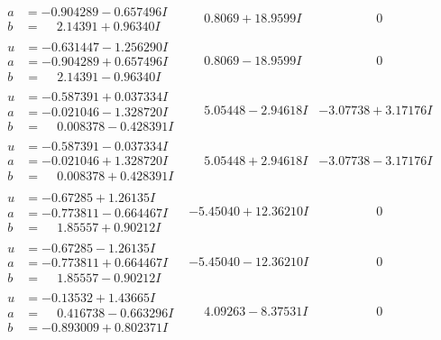 \documentclass[1p]{elsarticle_modified}
\theoremstyle{definition}
\begin{document}
$$\begin{array}{c|c|c}
\begin{aligned}
a &= -0.904289 - 0.657496 I \\
b &= \phantom{-}2.14391 + 0.96340 I\end{aligned}
 & \phantom{-}0.8069 + 18.9599 I & \phantom{-0.000000 } 0 \\ \hline\begin{aligned}
u &= -0.631447 - 1.256290 I \\
a &= -0.904289 + 0.657496 I \\
b &= \phantom{-}2.14391 - 0.96340 I\end{aligned}
 & \phantom{-}0.8069 - 18.9599 I & \phantom{-0.000000 } 0 \\ \hline\begin{aligned}
u &= -0.587391 + 0.037334 I \\
a &= -0.021046 - 1.328720 I \\
b &= \phantom{-}0.008378 - 0.428391 I\end{aligned}
 & \phantom{-}5.05448 - 2.94618 I & -3.07738 + 3.17176 I \\ \hline\begin{aligned}
u &= -0.587391 - 0.037334 I \\
a &= -0.021046 + 1.328720 I \\
b &= \phantom{-}0.008378 + 0.428391 I\end{aligned}
 & \phantom{-}5.05448 + 2.94618 I & -3.07738 - 3.17176 I \\ \hline\begin{aligned}
u &= -0.67285 + 1.26135 I \\
a &= -0.773811 - 0.664467 I \\
b &= \phantom{-}1.85557 + 0.90212 I\end{aligned}
 & -5.45040 + 12.36210 I & \phantom{-0.000000 } 0 \\ \hline\begin{aligned}
u &= -0.67285 - 1.26135 I \\
a &= -0.773811 + 0.664467 I \\
b &= \phantom{-}1.85557 - 0.90212 I\end{aligned}
 & -5.45040 - 12.36210 I & \phantom{-0.000000 } 0 \\ \hline\begin{aligned}
u &= -0.13532 + 1.43665 I \\
a &= \phantom{-}0.416738 - 0.663296 I \\
b &= -0.893009 + 0.802371 I\end{aligned}
 & \phantom{-}4.09263 - 8.37531 I & \phantom{-0.000000 } 0 \\ \hline\begin{aligned}

\end{aligned}
\end{array}$$
\end{document}

